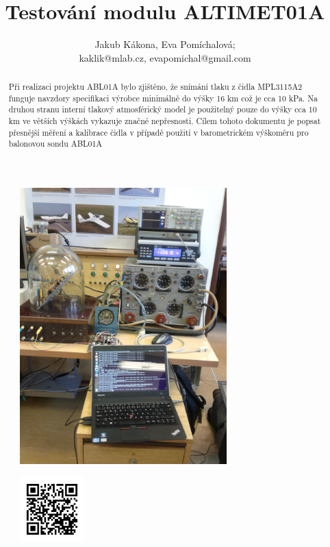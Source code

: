 \documentclass[12pt,a4paper,oneside]{article}
\begin{document}
\title{Testování modulu ALTIMET01A}
\author{Jakub Kákona, Eva Pomíchalová;\\ kaklik@mlab.cz, evapomichal@gmail.com}
\maketitle

\thispagestyle{empty}
\begin{abstract}
\noindent
Při realizaci projektu ABL01A bylo zjištěno, že snímání tlaku z čidla MPL3115A2 funguje navzdory specifikaci výrobce minimálně do výšky 16 km což je cca 10 kPa. Na druhou stranu interní tlakový atmosférický model je použitelný pouze do výšky cca 10 km ve větších výškách vykazuje značné nepřesnosti. Cílem tohoto dokumentu je popsat přesnější měření a kalibrace čidla v případě použití v barometrickém výškoměru pro balonovou sondu ABL01A
\end{abstract}

\begin{figure} [htbp]
\begin{center}
\includegraphics [width=80mm] {./img/altimet01a_testing_setup.jpg} 
\end{center}
\end{figure}

\begin{figure} [b]
\includegraphics [width=25mm] {./img/ALTIMET01A_QRcode.png} 
\end{figure}
\end{document}
